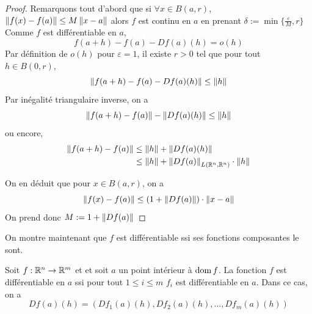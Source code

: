              \begin{proof}
                 Remarquons tout d'abord que si $\forall x\in B(a,r)$, $\left\| f(x)-f(a) \right\|\leq M\left\| x-a \right\|$ alors $f$ est continu en $a$ en prenant $\delta:= \min\{\frac{\varepsilon}{M},r\}$ Comme $f$ est différentiable en $a$, 
                 \begin{equation*}
                     f(a+h)-f(a)-Df(a)(h)=o(h)
                 \end{equation*}
                 Par définition de $o(h)$ pour $\varepsilon=1$, il existe $r>0$ tel que pour tout $h\in B(0,r),$
                 \begin{equation*}
                     \left\| f(a+h)-f(a)-Df(a)(h) \right\|\leq \left\| h \right\|
                 \end{equation*}
                 Par inégalité triangulaire inverse, on a
                 \begin{equation*}
                     \left\| f(a+h)-f(a) \right\|-\left\| Df(a)(h) \right\|\leq \left\| h \right\|
                 \end{equation*}
                 ou encore,
                 \begin{align*}
                     \left\| f(a+h)-f(a) \right\| &\leq \left\| h \right\|+\left\| Df(a)(h) \right\|\\
                     &\leq \left\| h \right\|+\left\| Df(a) \right\|_{L(\mathbb{R}^n,\mathbb{R}^n)}\cdot\left\| h \right\|
                 \end{align*}
                 
                 On en déduit que pour $x\in B(a,r)$, on a 
                 \begin{equation*}
                     \left\| f(x)-f(a) \right\|\leq (1+\left\| Df(a) \right\|)\cdot\left\| x-a \right\|
                 \end{equation*}
                 On prend donc $M:= 1+\left\| Df(a) \right\|$
             \end{proof}
                On montre maintenant que $f$ est différentiable ssi ses fonctions composantes le sont.
                \begin{proposition}
                    Soit $f:\mathbb{R}^n\to \mathbb{R}^m$ et et soit $a$ un point intérieur à $\operatorname{dom} f$. La fonction $f$ est différentiable en $a$ ssi pour tout $1\leq i\leq m$ $f_i$ est différentiable en $a$. Dans ce cas, on a 
                    \begin{equation*}
                        Df(a)(h)= (Df_1(a)(h),Df_2(a)(h),...,Df_m(a)(h))
                    \end{equation*}
                \end{proposition}
